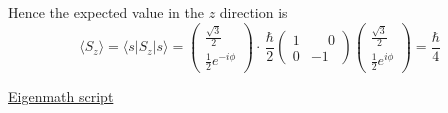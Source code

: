 Hence the expected value in the $z$ direction is
\begin{equation*}
\langle S_z\rangle=\langle s|S_z|s\rangle
=\begin{pmatrix}\frac{\sqrt3}{2}\\[1ex]\frac{1}{2}e^{-i\phi}\end{pmatrix}\cdot\,
\frac{\hbar}{2}\begin{pmatrix}1&\phantom{-}0\\0&-1\end{pmatrix}
\begin{pmatrix}\frac{\sqrt3}{2}\\[1ex]\frac{1}{2}e^{i\phi}\end{pmatrix}
=\frac{\hbar}{4}
\end{equation*}

\href{https://georgeweigt.github.io/examples/spin-part-3-demo.html}{Eigenmath script}



